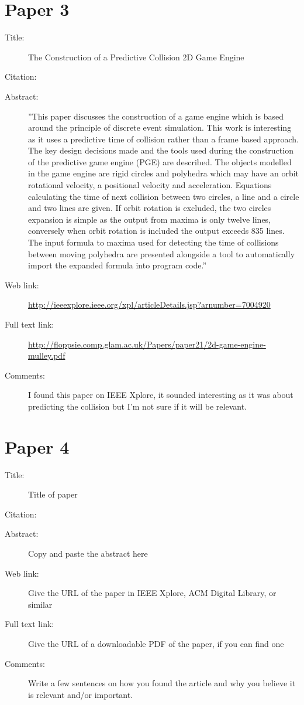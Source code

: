 \documentclass{scrartcl}
\begin{document}
\section*{Paper 3}
\begin{description}
\item[Title:] The Construction of a Predictive Collision 2D Game Engine
\item[Citation:] \cite{Mulley}
\item[Abstract:] ''This paper discusses the construction of a game engine which is based around the principle of discrete event simulation. This work is interesting as it uses a predictive time of collision rather than a frame based approach. The key design decisions made and the tools used during the construction of the predictive game engine (PGE) are described. The objects modelled in the game engine are rigid circles and polyhedra which may have an orbit rotational velocity, a positional velocity and acceleration. Equations calculating the time of next collision between two circles, a line and a circle and two lines are given. If orbit rotation is excluded, the two circles expansion is simple as the output from maxima is only twelve lines, conversely when orbit rotation is included the output exceeds 835 lines. The input formula to maxima used for detecting the time of collisions between moving polyhedra are presented alongside a tool to automatically import the expanded formula into program code.''
\item[Web link:] \url{http://ieeexplore.ieee.org/xpl/articleDetails.jsp?arnumber=7004920}
\item[Full text link:] \url{http://floppsie.comp.glam.ac.uk/Papers/paper21/2d-game-engine-mulley.pdf}
\item[Comments:] I found this paper on IEEE Xplore, it sounded interesting as it was about predicting the collision but I'm not sure if it will be relevant. 
\end{description}

\section*{Paper 4}
\begin{description}
	\item[Title:] Title of paper
	\item[Citation:] \cite{bibtex_key}
	\item[Abstract:] Copy and paste the abstract here
	\item[Web link:] Give the URL of the paper in IEEE Xplore, ACM Digital Library, or similar
	\item[Full text link:] Give the URL of a downloadable PDF of the paper, if you can find one
	\item[Comments:] Write a few sentences on how you found the article and why you believe it is relevant and/or important.
\end{description}
\end{document}
